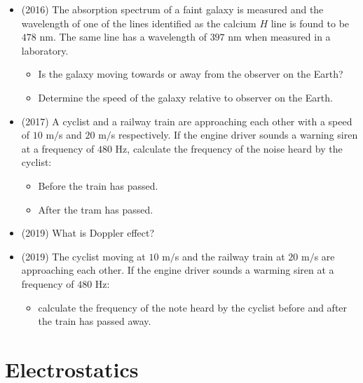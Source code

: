\documentclass{article}
\begin{document}
\begin{itemize}
\item (2016)  The absorption spectrum of a faint galaxy is measured and the wavelength of one of the lines identified as the calcium $ H$ line is found to be $ 478$ nm.  The same line has a wavelength of $ 397$ nm when measured in a laboratory. \begin{itemize}
\item Is the galaxy moving towards or away from the observer on the Earth?
\item Determine the speed of the galaxy relative to observer on the Earth.
\end{itemize}
\item (2017)  A cyclist and a railway train are approaching each other with a speed of $ 10$ m$/$s and $ 20$ m$/$s respectively. If the engine driver sounds a warning siren at a frequency of  $ 480$ Hz, calculate the frequency of the noise heard by the cyclist:\begin{itemize}
\item Before the train has passed.
\item After the tram has passed. 
\end{itemize}
\item (2019)  What is Doppler effect? 
\item (2019)  The cyclist moving at $ 10$ m$/$s and the railway train at $ 20$ m$/$s are approaching each other. If the engine driver sounds a warming siren at a frequency of $ 480$ Hz:\begin{itemize}
\item calculate the frequency of the note heard by the cyclist before and after the train has passed away. 
\end{itemize}
\end{itemize}


\section{Electrostatics}
\end{document}
